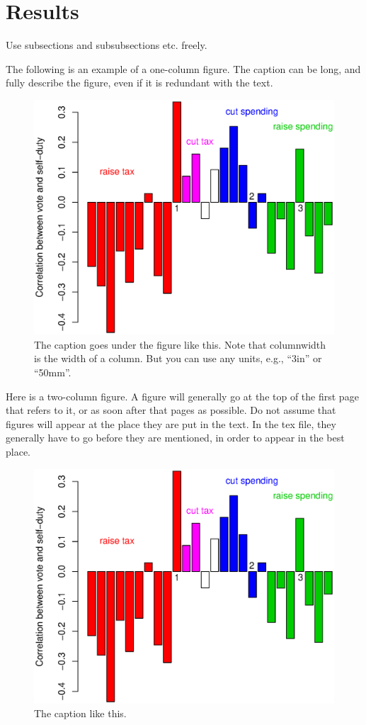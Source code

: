 \documentclass[12pt]{article}
\begin{document}
\section{Results}

Use subsections and subsubsections etc. freely.

The following is an example of a one-column figure. The caption can be
long, and fully describe the figure, even if it is redundant with the text.

\begin{figure}[t!]
\includegraphics[width=\columnwidth]{dut11.eps}
\caption{The caption goes under the figure like this. Note that
  columnwidth is the width of a column. But you can use any units,
  e.g., ``3in'' or ``50mm''.}
\end{figure}

Here is a two-column figure. A figure will generally go at the top of
the first page that refers to it, or as soon after that pages as
possible. Do not assume that figures will appear at the place they are
put in the text. In the tex file, they generally have to go before
they are mentioned, in order to appear in the best place.

\begin{figure}[t!]\centering
\includegraphics[width=5in]{dut11.eps}
\caption{The caption like this.}
\end{figure}
\end{document}
